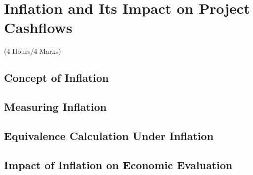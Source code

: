 \documentclass[12pt]{article}
\begin{document}
	\pagebreak
\section{Inflation and Its Impact on Project Cashflows}
	\begin{center}(4 Hours/4 Marks)\end{center}
	\subsection{Concept of Inflation}
	\subsection{Measuring Inflation}
	\subsection{Equivalence Calculation Under Inflation}
	\subsection{Impact of Inflation on Economic Evaluation}
\end{document}
